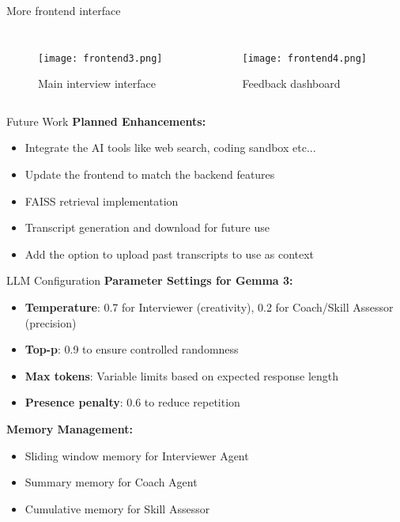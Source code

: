 \documentclass{beamer}
\begin{document}
\begin{frame}{More frontend interface}
    \begin{columns}[T]
        \begin{figure}
            \texttt{[image: frontend3.png]}
            \caption{Main interview interface}
        \end{figure}
        
        \begin{figure}
            \texttt{[image: frontend4.png]}
            \caption{Feedback dashboard}
        \end{figure}
    \end{columns}
\end{frame}

\begin{frame}{Future Work}
    \textbf{Planned Enhancements:}  
    \begin{itemize}
        \item Integrate the AI tools like web search, coding sandbox etc...
        \item Update the frontend to match the backend features  
        \item FAISS retrieval implementation 
        \item Transcript generation and download for future use 
        \item Add the option to upload past transcripts to use as context
    \end{itemize}
\end{frame}

\begin{frame}{LLM Configuration}
    \textbf{Parameter Settings for Gemma 3:}
    \begin{itemize}
        \item \textbf{Temperature}: 0.7 for Interviewer (creativity), 0.2 for Coach/Skill Assessor (precision)
        \item \textbf{Top-p}: 0.9 to ensure controlled randomness
        \item \textbf{Max tokens}: Variable limits based on expected response length
        \item \textbf{Presence penalty}: 0.6 to reduce repetition
    \end{itemize}
    
    \textbf{Memory Management:}
    \begin{itemize}
        \item Sliding window memory for Interviewer Agent
        \item Summary memory for Coach Agent
        \item Cumulative memory for Skill Assessor
    \end{itemize}
\end{frame}
\end{document}
